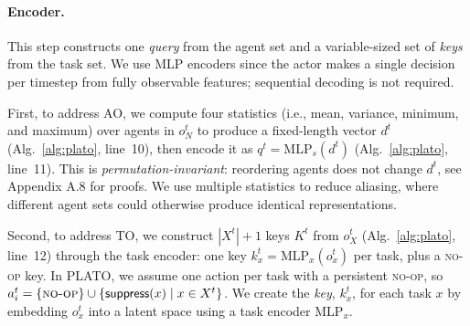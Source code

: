 \paragraph{Encoder.}\label{actor:encoder}
This step constructs one \emph{query} from the agent set and a variable-sized set of \emph{keys} from the task set. We use MLP encoders since the actor makes a single decision per timestep from fully observable features; sequential decoding is not required.

First, to address AO, we compute four statistics (i.e., mean, variance, minimum, and maximum) over agents in $o^t_N$ to produce a fixed-length vector $d^t$ (Alg.~\ref{alg:plato}, line~10), then encode it as $q^t = \mathrm{MLP}_s(d^t)$ (Alg.~\ref{alg:plato}, line~11). This is \emph{permutation-invariant}: reordering agents does not change $d^t$, see Appendix A.8 for proofs. We use multiple statistics to reduce aliasing, where different agent sets could otherwise produce identical representations. 

Second, to address TO, we construct $|X^t|+1$ keys $K^t$ from $o^t_X$ (Alg.~\ref{alg:plato}, line~12) through the task encoder: one key $k_x^t = \mathrm{MLP}_x(o_x^t)$ per task, plus a \textsc{no-op} key.   In PLATO, we assume one action per task with a persistent \textsc{no-op}, so $a_i^t=\{\textsc{no-op}\}\cup\{\textsf{suppress}(x)\mid x\in X^t\}$. %
We create the \emph{key}, $k_x^t$, for each task $x$ by embedding $o_x^t$ into a latent space using a task encoder $\mathrm{MLP}_x$. 









